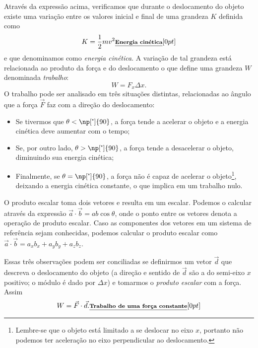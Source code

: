 Através da expressão acima, verificamos que durante o deslocamento do objeto existe uma variação entre os valores inicial e final de uma grandeza $K$ definida como
\begin{equation}
  K = \frac{1}{2} m v^2 \relax{\footnotesize\emph{\textbf{Energia cinética}}}[0pt]
\end{equation}
%
e que denominamos como \emph{energia cinética}. A variação de tal grandeza está relacionada ao produto da força e do deslocamento o que define uma grandeza $W$ denominada \emph{trabalho}:
\begin{equation}
  W = F_x \Delta x.
\end{equation}
%
O trabalho pode ser analisado em três situações distintas, relacionadas ao ângulo que a força $\vec{F}$ faz com a direção do deslocamento:
\begin{itemize}
    \item Se tivermos que $\theta < \np[\tcdegree]{90}$, a força tende a acelerar o objeto e a energia cinética deve aumentar com o tempo;
    \item Se, por outro lado, $\theta > \np[\tcdegree]{90}$, a força tende a desacelerar o objeto, diminuindo sua energia cinética;
    \item Finalmente, se $\theta = \np[\tcdegree]{90}$, a força não é capaz de acelerar o objeto\footnote[][-5cm]{Lembre-se que o objeto está limitado a se deslocar no eixo $x$, portanto não podemos ter aceleração no eixo perpendicular ao deslocamento.}, deixando a energia cinética constante, o que implica em um trabalho nulo.
\end{itemize}
%
\begin{marginfigure}[-3cm]
\centering
{}
\caption{O produto escalar toma dois vetores e resulta em um escalar. Podemos o calcular através da expressão $\vec{a} \cdot \vec{b} = ab\cos\theta$, onde o ponto entre os vetores denota a operação de produto escalar. Caso as componentes dos vetores em um sistema de referência sejam conhecidas, podemos calcular o produto escalar como $\vec{a} \cdot \vec{b} = a_xb_x + a_yb_y + a_zb_z$.}
\end{marginfigure}

\noindent{}Essas três observações podem ser conciliadas se definirmos um vetor $\vec{d}$ que descreva o deslocamento do objeto (a direção e sentido de $\vec{d}$ são a do semi-eixo $x$ positivo; o módulo é dado por $\Delta x$) e tomarmos o \emph{produto escalar} com a força. Assim
\begin{equation}\label{Eq:TrabalhoForcaConstante}
  W = \vec{F}\cdot\vec{d}. \relax{\footnotesize\emph{\textbf{Trabalho de uma força constante}}}[0pt]
\end{equation}

